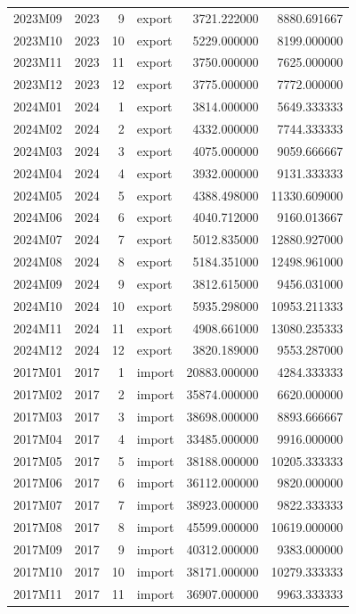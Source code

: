 \begin{tabular}{lrrlrr}
2023M09 & 2023 & 9 & export & 3721.222000 & 8880.691667 \\
2023M10 & 2023 & 10 & export & 5229.000000 & 8199.000000 \\
2023M11 & 2023 & 11 & export & 3750.000000 & 7625.000000 \\
2023M12 & 2023 & 12 & export & 3775.000000 & 7772.000000 \\
2024M01 & 2024 & 1 & export & 3814.000000 & 5649.333333 \\
2024M02 & 2024 & 2 & export & 4332.000000 & 7744.333333 \\
2024M03 & 2024 & 3 & export & 4075.000000 & 9059.666667 \\
2024M04 & 2024 & 4 & export & 3932.000000 & 9131.333333 \\
2024M05 & 2024 & 5 & export & 4388.498000 & 11330.609000 \\
2024M06 & 2024 & 6 & export & 4040.712000 & 9160.013667 \\
2024M07 & 2024 & 7 & export & 5012.835000 & 12880.927000 \\
2024M08 & 2024 & 8 & export & 5184.351000 & 12498.961000 \\
2024M09 & 2024 & 9 & export & 3812.615000 & 9456.031000 \\
2024M10 & 2024 & 10 & export & 5935.298000 & 10953.211333 \\
2024M11 & 2024 & 11 & export & 4908.661000 & 13080.235333 \\
2024M12 & 2024 & 12 & export & 3820.189000 & 9553.287000 \\
2017M01 & 2017 & 1 & import & 20883.000000 & 4284.333333 \\
2017M02 & 2017 & 2 & import & 35874.000000 & 6620.000000 \\
2017M03 & 2017 & 3 & import & 38698.000000 & 8893.666667 \\
2017M04 & 2017 & 4 & import & 33485.000000 & 9916.000000 \\
2017M05 & 2017 & 5 & import & 38188.000000 & 10205.333333 \\
2017M06 & 2017 & 6 & import & 36112.000000 & 9820.000000 \\
2017M07 & 2017 & 7 & import & 38923.000000 & 9822.333333 \\
2017M08 & 2017 & 8 & import & 45599.000000 & 10619.000000 \\
2017M09 & 2017 & 9 & import & 40312.000000 & 9383.000000 \\
2017M10 & 2017 & 10 & import & 38171.000000 & 10279.333333 \\
2017M11 & 2017 & 11 & import & 36907.000000 & 9963.333333 \\

\end{tabular}
